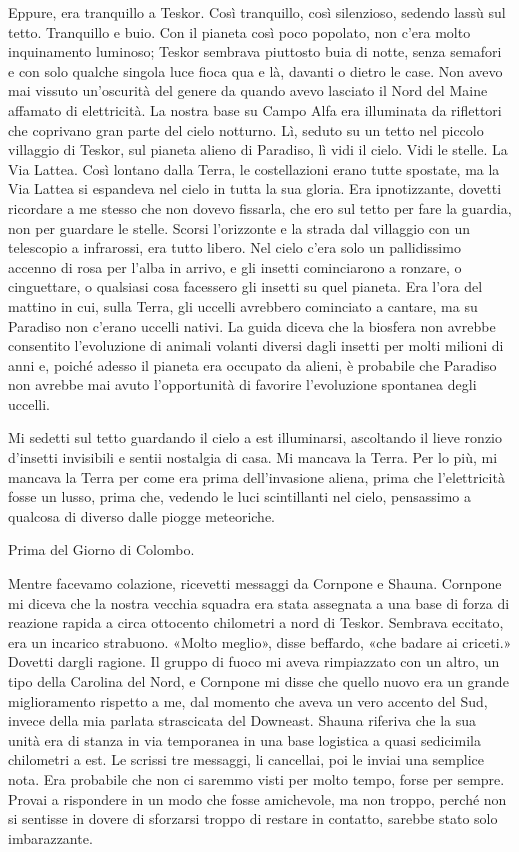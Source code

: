 Eppure, era tranquillo a Teskor. Così tranquillo, così silenzioso,
sedendo lassù sul tetto. Tranquillo e buio. Con il pianeta così poco
popolato, non c'era molto inquinamento luminoso; Teskor sembrava
piuttosto buia di notte, senza semafori e con solo qualche singola luce
fioca qua e là, davanti o dietro le case. Non avevo mai vissuto
un'oscurità del genere da quando avevo lasciato il Nord del Maine
affamato di elettricità. La nostra base su Campo Alfa era illuminata da
riflettori che coprivano gran parte del cielo notturno. Lì, seduto su un
tetto nel piccolo villaggio di Teskor, sul pianeta alieno di Paradiso,
lì vidi il cielo. Vidi le stelle. La Via Lattea. Così lontano dalla
Terra, le costellazioni erano tutte spostate, ma la Via Lattea si
espandeva nel cielo in tutta la sua gloria. Era ipnotizzante, dovetti
ricordare a me stesso che non dovevo fissarla, che ero sul tetto per
fare la guardia, non per guardare le stelle. Scorsi l'orizzonte e la
strada dal villaggio con un telescopio a infrarossi, era tutto libero.
Nel cielo c'era solo un pallidissimo accenno di rosa per l'alba in
arrivo, e gli insetti cominciarono a ronzare, o cinguettare, o qualsiasi
cosa facessero gli insetti su quel pianeta. Era l'ora del mattino in
cui, sulla Terra, gli uccelli avrebbero cominciato a cantare, ma su
Paradiso non c'erano uccelli nativi. La guida diceva che la biosfera non
avrebbe consentito l'evoluzione di animali volanti diversi dagli insetti
per molti milioni di anni e, poiché adesso il pianeta era occupato da
alieni, è probabile che Paradiso non avrebbe mai avuto l'opportunità di
favorire l'evoluzione spontanea degli uccelli.

Mi sedetti sul tetto guardando il cielo a est illuminarsi, ascoltando il
lieve ronzio d'insetti invisibili e sentii nostalgia di casa. Mi mancava
la Terra. Per lo più, mi mancava la Terra per come era prima
dell'invasione aliena, prima che l'elettricità fosse un lusso, prima
che, vedendo le luci scintillanti nel cielo, pensassimo a qualcosa di
diverso dalle piogge meteoriche.

Prima del Giorno di Colombo.

\hfill\break

Mentre facevamo colazione, ricevetti messaggi da Cornpone e Shauna.
Cornpone mi diceva che la nostra vecchia squadra era stata assegnata a
una base di forza di reazione rapida a circa ottocento chilometri a nord
di Teskor. Sembrava eccitato, era un incarico strabuono. «Molto meglio»,
disse beffardo, «che badare ai criceti.» Dovetti dargli ragione. Il
gruppo di fuoco mi aveva rimpiazzato con un altro, un tipo della
Carolina del Nord, e Cornpone mi disse che quello nuovo era un grande
miglioramento rispetto a me, dal momento che aveva un vero accento del
Sud, invece della mia parlata strascicata del Downeast. Shauna riferiva
che la sua unità era di stanza in via temporanea in una base logistica a
quasi sedicimila chilometri a est. Le scrissi tre messaggi, li
cancellai, poi le inviai una semplice nota. Era probabile che non ci
saremmo visti per molto tempo, forse per sempre. Provai a rispondere in
un modo che fosse amichevole, ma non troppo, perché non si sentisse in
dovere di sforzarsi troppo di restare in contatto, sarebbe stato solo
imbarazzante.

